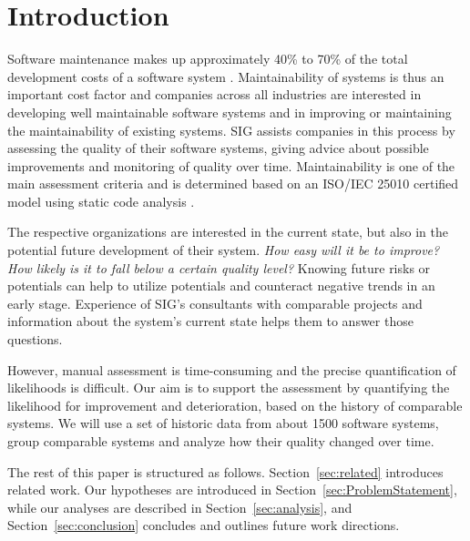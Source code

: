 \section{Introduction}
Software maintenance makes up approximately 40\% to 70\% of the total development costs of a software system \cite{grubb2003software}.
Maintainability of systems is thus an important cost factor and companies across all industries are interested in developing well maintainable software systems and in improving or maintaining the maintainability of existing systems.
SIG assists companies in this process by assessing the quality of their software systems, giving advice about possible improvements and monitoring of quality over time.
Maintainability is one of the main assessment criteria and is determined based on an ISO/IEC 25010 certified model using static code analysis \cite{heitlager2007practical}.

The respective organizations are interested in the current state, but also in the potential future development of their system.
\textit{How easy will it be to improve?} \textit{How likely is it to fall below a certain quality level?} Knowing future risks or potentials can help to utilize potentials and counteract negative trends in an early stage.
Experience of SIG's consultants with comparable projects and information about the system's current state helps them to answer those questions. 

However, manual assessment is time-consuming and the precise quantification of likelihoods is difficult.
Our aim is to support the assessment by quantifying the likelihood for improvement and deterioration, based on the history of comparable systems.
We will use a set of historic data from about 1500 software systems, group comparable systems and analyze how their quality changed over time.

The rest of this paper is structured as follows.
Section~\ref{sec:related} introduces related work.
Our hypotheses are introduced in Section~\ref{sec:ProblemStatement}, while our analyses are described in Section~\ref{sec:analysis}, and Section~\ref{sec:conclusion} concludes and outlines future work directions.
